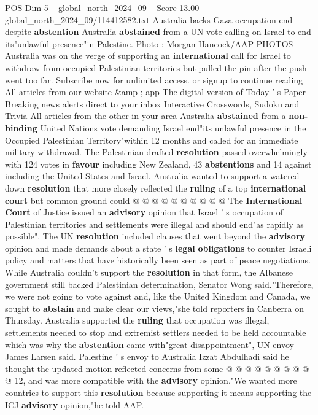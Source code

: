 \begin{textsample}{POS Dim 5 – global\_north\_2024\_09 – Score 13.00 – global\_north\_2024\_09/114412582.txt}  \label{ex:f5_pos_318}
Australia backs Gaza occupation end despite \textbf{abstention} Australia \textbf{abstained} from a UN vote calling on Israel to end its"unlawful presence"in Palestine.
Photo : Morgan Hancock/AAP PHOTOS Australia was on the verge of supporting an \textbf{international} call for Israel to withdraw from occupied Palestinian territories but pulled the pin after the push went too far.
Subscribe now for unlimited access. or signup to continue reading All articles from our website \&amp ; app The digital version of Today ' s Paper Breaking news alerts direct to your inbox Interactive Crosswords, Sudoku and Trivia All articles from the other in your area Australia \textbf{abstained} from a \textbf{non-binding} United Nations vote demanding Israel end"its unlawful presence in the Occupied Palestinian Territory"within 12 months and called for an immediate military withdrawal.
The Palestinian-drafted \textbf{resolution} passed overwhelmingly with 124 votes in \textbf{favour} including New Zealand, 43 \textbf{abstentions} and 14 against including the United States and Israel.
Australia wanted to support a watered-down \textbf{resolution} that more closely reflected the \textbf{ruling} of a top \textbf{international} \textbf{court} but common ground could @ @ @ @ @ @ @ @ @ @ The \textbf{International} \textbf{Court} of Justice issued an \textbf{advisory} opinion that Israel ' s occupation of Palestinian territories and settlements were illegal and should end"as rapidly as possible".
The UN \textbf{resolution} included clauses that went beyond the \textbf{advisory} opinion and made demands about a state ' s \textbf{legal} \textbf{obligations} to counter Israeli policy and matters that have historically been seen as part of peace negotiations.
While Australia couldn't support the \textbf{resolution} in that form, the Albanese government still backed Palestinian determination, Senator Wong said."Therefore, we were not going to vote against and, like the United Kingdom and Canada, we sought to \textbf{abstain} and make clear our views,"she told reporters in Canberra on Thursday.
Australia supported the \textbf{ruling} that occupation was illegal, settlements needed to stop and extremist settlers needed to be held accountable which was why the \textbf{abstention} came with"great disappointment", UN envoy James Larsen said.
Palestine ' s envoy to Australia Izzat Abdulhadi said he thought the updated motion reflected concerns from some @ @ @ @ @ @ @ @ @ @ 12, and was more compatible with the \textbf{advisory} opinion."We wanted more countries to support this \textbf{resolution} because supporting it means supporting the ICJ \textbf{advisory} opinion,"he told AAP.

\end{textsample}
